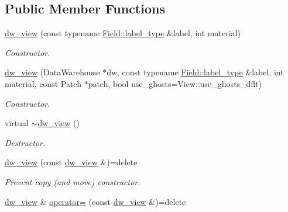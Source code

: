 \subsection*{Public Member Functions}
\begin{DoxyCompactItemize}
\item 
\hyperlink{classUintah_1_1PhaseField_1_1detail_1_1dw__view_3_01VectorField_3_01T_00_01N_01_4_00_01VAR_00_01DIM_00_01GN_01_4_aecbe0f3de7d15c38a27a499064780365}{dw\+\_\+view} (const typename \hyperlink{structUintah_1_1PhaseField_1_1VectorField_a59698346336d8cdfdf767367839f2be9}{Field\+::label\+\_\+type} \&label, int material)
\begin{DoxyCompactList}\small\item\em Constructor. \end{DoxyCompactList}\item 
\hyperlink{classUintah_1_1PhaseField_1_1detail_1_1dw__view_3_01VectorField_3_01T_00_01N_01_4_00_01VAR_00_01DIM_00_01GN_01_4_ab3fdf4520ef9422785a87063533e3d25}{dw\+\_\+view} (Data\+Warehouse $\ast$dw, const typename \hyperlink{structUintah_1_1PhaseField_1_1VectorField_a59698346336d8cdfdf767367839f2be9}{Field\+::label\+\_\+type} \&label, int material, const Patch $\ast$patch, bool use\+\_\+ghosts=View\+::use\+\_\+ghosts\+\_\+dflt)
\begin{DoxyCompactList}\small\item\em Constructor. \end{DoxyCompactList}\item 
virtual \hyperlink{classUintah_1_1PhaseField_1_1detail_1_1dw__view_3_01VectorField_3_01T_00_01N_01_4_00_01VAR_00_01DIM_00_01GN_01_4_a4f9a81dfd5d8870e8551e07401e0b150}{$\sim$dw\+\_\+view} ()
\begin{DoxyCompactList}\small\item\em Destructor. \end{DoxyCompactList}\item 
\hyperlink{classUintah_1_1PhaseField_1_1detail_1_1dw__view_3_01VectorField_3_01T_00_01N_01_4_00_01VAR_00_01DIM_00_01GN_01_4_a717de535076e8c4810bda5d6abb8357d}{dw\+\_\+view} (const \hyperlink{classUintah_1_1PhaseField_1_1detail_1_1dw__view}{dw\+\_\+view} \&)=delete
\begin{DoxyCompactList}\small\item\em Prevent copy (and move) constructor. \end{DoxyCompactList}\item 
\hyperlink{classUintah_1_1PhaseField_1_1detail_1_1dw__view}{dw\+\_\+view} \& \hyperlink{classUintah_1_1PhaseField_1_1detail_1_1dw__view_3_01VectorField_3_01T_00_01N_01_4_00_01VAR_00_01DIM_00_01GN_01_4_ae098d4f14122168c80fc3e224f01639d}{operator=} (const \hyperlink{classUintah_1_1PhaseField_1_1detail_1_1dw__view}{dw\+\_\+view} \&)=delete

\end{DoxyCompactItemize}
